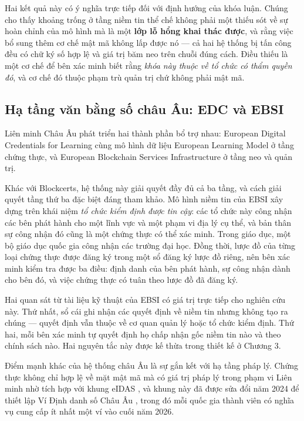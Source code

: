 Hai kết quả này có ý nghĩa trực tiếp đối với định hướng của khóa luận. Chúng cho thấy khoảng trống ở tầng niềm tin thể chế không phải một thiếu sót về sự hoàn chỉnh của mô hình mà là một \textbf{lớp lỗ hổng khai thác được}, và rằng việc bổ sung thêm cơ chế mật mã không lấp được nó --- cả hai hệ thống bị tấn công đều có chữ ký số hợp lệ và giá trị băm neo trên chuỗi đúng cách. Điều thiếu là một cơ chế để bên xác minh biết rằng \emph{khóa này thuộc về tổ chức có thẩm quyền đó}, và cơ chế đó thuộc phạm trù quản trị chứ không phải mật mã.

\subsection{Hạ tầng văn bằng số châu Âu: EDC và EBSI}

Liên minh Châu Âu phát triển hai thành phần bổ trợ nhau: European Digital Credentials for Learning cùng mô hình dữ liệu European Learning Model \cite{EDC_ELM} ở tầng chứng thực, và European Blockchain Services Infrastructure \cite{EBSI_TrustModel} ở tầng neo và quản trị.

Khác với Blockcerts, hệ thống này giải quyết đầy đủ cả ba tầng, và cách giải quyết tầng thứ ba đặc biệt đáng tham khảo. Mô hình niềm tin của EBSI xây dựng trên khái niệm \emph{tổ chức kiểm định được tin cậy}: các tổ chức này công nhận các bên phát hành cho một lĩnh vực và một phạm vi địa lý cụ thể, và bản thân sự công nhận đó cũng là một chứng thực có thể xác minh. Trong giáo dục, một bộ giáo dục quốc gia công nhận các trường đại học. Đồng thời, lược đồ của từng loại chứng thực được đăng ký trong một sổ đăng ký lược đồ riêng, nên bên xác minh kiểm tra được ba điều: định danh của bên phát hành, sự công nhận dành cho bên đó, và việc chứng thực có tuân theo lược đồ đã đăng ký.

Hai quan sát từ tài liệu kỹ thuật của EBSI có giá trị trực tiếp cho nghiên cứu này. Thứ nhất, sổ cái ghi nhận các quyết định về niềm tin nhưng không tạo ra chúng --- quyết định vẫn thuộc về cơ quan quản lý hoặc tổ chức kiểm định. Thứ hai, mỗi bên xác minh tự quyết định họ chấp nhận gốc niềm tin nào và theo chính sách nào. Hai nguyên tắc này được kế thừa trong thiết kế ở Chương 3.

Điểm mạnh khác của hệ thống châu Âu là sự gắn kết với hạ tầng pháp lý. Chứng thực không chỉ hợp lệ về mặt mật mã mà có giá trị pháp lý trong phạm vi Liên minh nhờ tích hợp với khung eIDAS \cite{eIDAS2014}, và khung này đã được sửa đổi năm 2024 để thiết lập Ví Định danh số Châu Âu \cite{eIDAS2_2024}, trong đó mỗi quốc gia thành viên có nghĩa vụ cung cấp ít nhất một ví vào cuối năm 2026.

